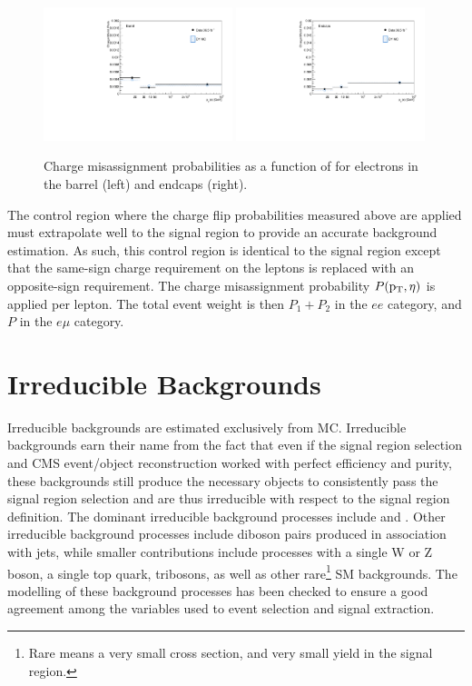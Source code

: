 \begin{figure}[htp]
\centering
\includegraphics[width=0.49\textwidth]{ch7_figs/chmid_prob_barrel.pdf}
\includegraphics[width=0.49\textwidth]{ch7_figs/chmid_prob_endcap.pdf}\\
\caption[Electron charge misassignment probabilities in data and MC.]{Charge misassignment probabilities as a function of \pt for electrons in the barrel (left) and endcaps (right).}
\label{fig:fliprate}
\end{figure}
 
The control region where the charge flip probabilities measured above are applied must extrapolate well to the signal region to provide an accurate background estimation. As such, this control region
is identical to the signal region except that the same-sign charge requirement on the leptons is replaced with an opposite-sign requirement.
The charge misassignment probability $P(\mathrm{p}_{\mathrm{T}},\eta)$ is applied per lepton. The total event weight is then $P_{1} + P_{2}$ in the $ee$ category, and $P$ in the $e\mu$ category.  

\section{Irreducible Backgrounds}
Irreducible backgrounds are estimated exclusively from MC. Irreducible backgrounds earn their name from the fact that even if the signal region selection and CMS event/object reconstruction
worked with perfect efficiency and purity, these backgrounds still produce the necessary objects to consistently pass the signal region selection and are thus irreducible with respect to the signal
region definition. The dominant irreducible background processes include \ttw and \ttz. Other irreducible background processes include diboson pairs produced in association with jets,
while smaller contributions include processes with a single W or Z boson, a single top quark, tribosons, as well as other rare\footnote{Rare means a very small cross section, and very
small yield in the signal region.} SM backgrounds. The modelling of these background processes has been checked to ensure a good agreement among the variables used to event selection and
signal extraction.  

